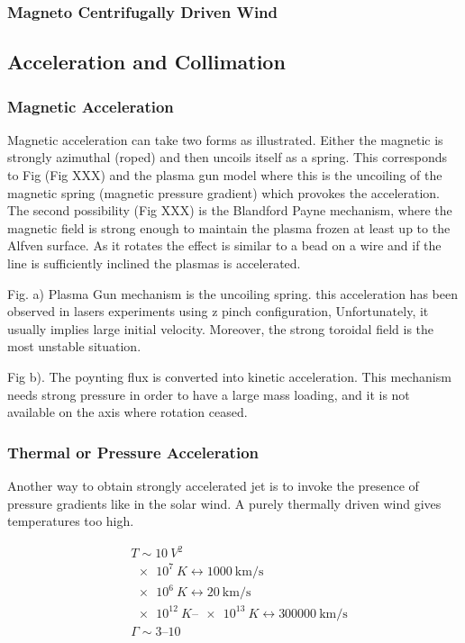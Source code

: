 \documentclass[10pt,a4paper,english,draft]{article}
\begin{document}
\subsubsection{Magneto Centrifugally Driven Wind}
\subsection{Acceleration and Collimation}
\subsubsection{Magnetic Acceleration}

Magnetic acceleration can take two forms as illustrated. Either the magnetic is strongly
azimuthal (roped) and then uncoils itself as a spring. This corresponds to Fig (Fig XXX)
and the plasma gun model where this is the uncoiling of the magnetic spring (magnetic pressure gradient)
which provokes the acceleration. The second possibility (Fig XXX) is the Blandford Payne mechanism, where the magnetic field
is strong enough to maintain the plasma frozen at least up to the Alfven surface. As it rotates the effect is similar to a bead
on a wire and if the line is sufficiently inclined the plasmas is accelerated.


Fig. a) Plasma Gun mechanism is the uncoiling spring. this acceleration has been observed in lasers experiments using z pinch configuration, Unfortunately, it usually implies large initial velocity.
Moreover, the strong toroidal field is the most unstable situation.

Fig b). The poynting flux is converted into kinetic acceleration. This mechanism needs strong pressure 
in order to have  a large mass loading, and it is not available on the axis where rotation ceased. 

\subsubsection{Thermal or Pressure Acceleration}

Another way to obtain strongly accelerated jet is to invoke the presence of pressure gradients 
like in the solar wind. A purely thermally driven wind gives temperatures too high.

\begin{align*}
  & T \sim \SI{10}{V^2} \\
  & \SI{e7}{K} \leftrightarrow	  \SI{1000}{\km\per \s } \\
  & \SI{e6}{K} \leftrightarrow \SI{20}{\km \per\s}  \\
  &\SIrange{e12}{e13}{K} \leftrightarrow  \SI{300000}{\km \per \s} \\
  & \Gamma \sim \numrange{3}{10}
\end{align*}
\end{document}

